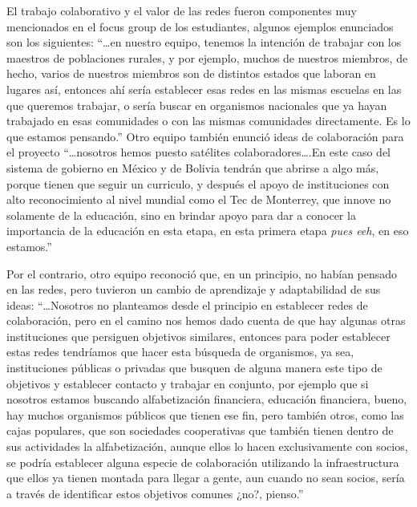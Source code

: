 \documentclass[spanish]{textolivre}
\begin{document}
El trabajo colaborativo y el valor de las redes fueron componentes muy mencionados en el focus group de los estudiantes, algunos ejemplos enunciados son los siguientes: “…en nuestro equipo, tenemos la intención de trabajar con los maestros de poblaciones rurales, y por ejemplo, muchos de nuestros miembros, de hecho, varios de nuestros miembros son de distintos estados que laboran en lugares así, entonces ahí sería establecer esas redes en las mismas escuelas en las que queremos trabajar, o sería buscar en organismos nacionales que ya hayan trabajado en esas comunidades o con las mismas comunidades directamente. Es lo que estamos pensando.” Otro equipo también enunció ideas de colaboración para el proyecto “…nosotros hemos puesto satélites colaboradores….En este caso del sistema de gobierno en México y de Bolivia tendrán que abrirse a algo más, porque tienen que seguir un curriculo, y después el apoyo de instituciones con alto reconocimiento al nivel mundial como el Tec de Monterrey, que innove no solamente de la educación, sino en brindar apoyo para dar a conocer la importancia de la educación en esta etapa, en esta primera etapa \emph{pues eeh}, en eso estamos.” 

Por el contrario, otro equipo reconoció que, en un principio, no habían pensado en las redes, pero tuvieron un cambio de aprendizaje y adaptabilidad de sus ideas: “…Nosotros no planteamos desde el principio en establecer redes de colaboración, pero en el camino nos hemos dado cuenta de que hay algunas otras instituciones que persiguen objetivos similares, entonces para poder establecer estas redes tendríamos que hacer esta búsqueda de organismos, ya sea, instituciones públicas o privadas que busquen de alguna manera este tipo de objetivos y establecer contacto y trabajar en conjunto, por ejemplo que si nosotros estamos buscando alfabetización financiera, educación financiera, bueno, hay muchos organismos públicos que tienen ese fin, pero también otros, como las cajas populares, que son sociedades cooperativas que también tienen dentro de sus actividades la alfabetización, aunque ellos lo hacen exclusivamente con socios, se podría establecer alguna especie de colaboración utilizando la infraestructura que ellos ya tienen montada para llegar a gente, aun cuando no sean socios, sería a través de identificar estos objetivos comunes ¿no?, pienso.”
\end{document}
